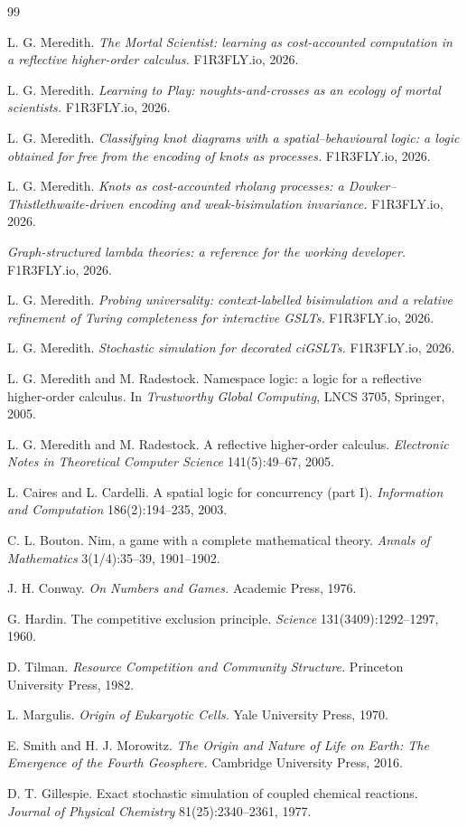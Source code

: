 \documentclass[11pt,a4paper]{article}
\theoremstyle{plain}
\theoremstyle{definition}
\theoremstyle{remark}
\begin{document}
\begin{thebibliography}{99}

 L. G. Meredith. \emph{The Mortal Scientist: learning as cost-accounted
computation in a reflective higher-order calculus.} F1R3FLY.io, 2026.

 L. G. Meredith. \emph{Learning to Play: noughts-and-crosses as an ecology of
mortal scientists.} F1R3FLY.io, 2026.

 L. G. Meredith. \emph{Classifying knot diagrams with a spatial--behavioural
logic: a logic obtained for free from the encoding of knots as processes.} F1R3FLY.io, 2026.

 L. G. Meredith. \emph{Knots as cost-accounted rholang processes: a
Dowker--Thistlethwaite-driven encoding and weak-bisimulation invariance.} F1R3FLY.io, 2026.

 \emph{Graph-structured lambda theories: a reference for the working developer.}
F1R3FLY.io, 2026.

 L. G. Meredith. \emph{Probing universality: context-labelled bisimulation
and a relative refinement of Turing completeness for interactive GSLTs.} F1R3FLY.io, 2026.

 L. G. Meredith. \emph{Stochastic simulation for decorated ciGSLTs.}
F1R3FLY.io, 2026.

 L. G. Meredith and M. Radestock. Namespace logic: a logic for a reflective
higher-order calculus. In \emph{Trustworthy Global Computing}, LNCS 3705, Springer, 2005.

 L. G. Meredith and M. Radestock. A reflective higher-order calculus.
\emph{Electronic Notes in Theoretical Computer Science} 141(5):49--67, 2005.

 L. Caires and L. Cardelli. A spatial logic for concurrency (part I).
\emph{Information and Computation} 186(2):194--235, 2003.

 C. L. Bouton. Nim, a game with a complete mathematical theory.
\emph{Annals of Mathematics} 3(1/4):35--39, 1901--1902.

 J. H. Conway. \emph{On Numbers and Games.} Academic Press, 1976.

 G. Hardin. The competitive exclusion principle. \emph{Science}
131(3409):1292--1297, 1960.

 D. Tilman. \emph{Resource Competition and Community Structure.} Princeton
University Press, 1982.

 L. Margulis. \emph{Origin of Eukaryotic Cells.} Yale University Press, 1970.

 E. Smith and H. J. Morowitz. \emph{The Origin and Nature of Life on Earth: The
Emergence of the Fourth Geosphere.} Cambridge University Press, 2016.

 D. T. Gillespie. Exact stochastic simulation of coupled chemical reactions.
\emph{Journal of Physical Chemistry} 81(25):2340--2361, 1977.

\end{thebibliography}
\end{document}
